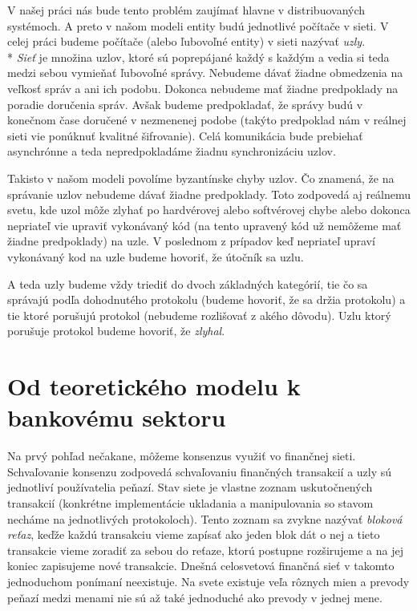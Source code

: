 V našej práci nás bude tento problém zaujímať hlavne v distribuovaných systémoch.
A preto v našom modeli entity budú jednotlivé počítače v sieti.
V celej práci budeme počítače (alebo ľubovoľné entity) v sieti nazývať 
\textit{uzly}.
\\*
\textit{Sieť} je množina uzlov, ktoré sú poprepájané každý s každým a vedia si
teda medzi sebou vymieňať ľubovoľné správy. Nebudeme dávať žiadne obmedzenia
na veľkosť správ a ani ich podobu. Dokonca nebudeme mať žiadne predpoklady na
poradie doručenia správ. Avšak budeme predpokladať, že správy budú
v konečnom čase doručené v nezmenenej podobe (takýto predpoklad nám v reálnej
sieti vie ponúknuť kvalitné šifrovanie).
Celá komunikácia bude prebiehať asynchrónne a teda nepredpokladáme žiadnu
synchronizáciu uzlov.

Takisto v našom modeli povolíme byzantínske chyby uzlov.
Čo znamená, že na správanie uzlov nebudeme dávať žiadne predpoklady.
Toto zodpovedá aj reálnemu svetu, kde uzol môže zlyhať po hardvérovej alebo
softvérovej chybe alebo dokonca nepriateľ vie upraviť vykonávaný kód (na tento
upravený kód už nemôžeme mať žiadne predpoklady) na uzle.
V poslednom z prípadov keď nepriateľ upraví vykonávaný kod na uzle budeme
hovoriť, že útočník sa  uzlu.

A teda uzly budeme vždy triediť do dvoch základných kategórií, tie čo sa správajú
podľa dohodnutého protokolu (budeme hovoriť, že sa držia protokolu) a tie ktoré
porušujú protokol (nebudeme rozlišovať z akého dôvodu). Uzlu ktorý porušuje protokol budeme hovoriť, že \textit{zlyhal}.

\section {Od teoretického modelu k bankovému sektoru}

Na prvý pohľad nečakane, môžeme konsenzus využiť vo finančnej sieti.
Schvaľovanie konsenzu zodpovedá schvaľovaniu finančných transakcií a uzly sú
jednotliví používatelia peňazí. Stav siete je vlastne zoznam uskutočnených
transakcií (konkrétne implementácie ukladania a manipulovania so stavom necháme
na jednotlivých protokoloch).
Tento zoznam sa zvykne nazývať \textit{bloková reťaz}, keďže každú
transakciu vieme zapísať ako jeden blok dát o nej a tieto transakcie vieme
zoradiť za sebou do reťaze, ktorú postupne rozširujeme a na jej koniec
zapisujeme nové transakcie.
Dnešná celosvetová finančná sieť v takomto jednoduchom ponímaní neexistuje. Na
svete existuje veľa rôznych mien a prevody peňazí medzi menami nie sú až také
jednoduché ako prevody v jednej mene.

